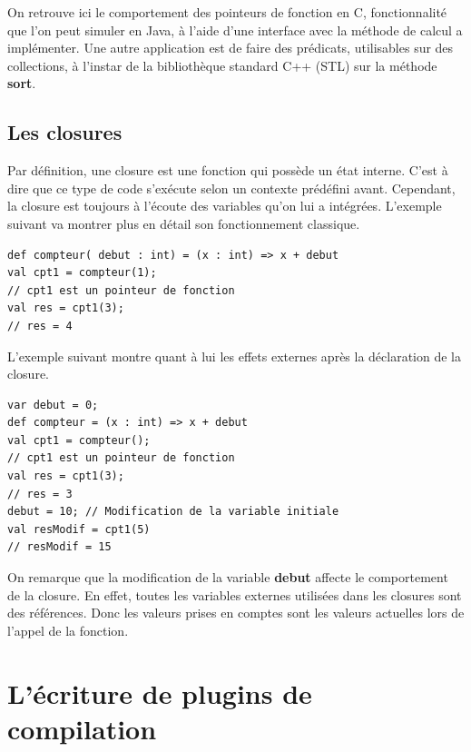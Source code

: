 \documentclass[a4paper,11pt]{report}
\begin{document}
{{{	On retrouve ici le comportement des pointeurs de fonction en C, fonctionnalité que l'on peut simuler en Java, à l'aide d'une interface avec la méthode de calcul a implémenter. Une autre application est de faire des prédicats, utilisables sur des collections, à l'instar de la bibliothèque standard C++ (STL) sur la méthode {\bf sort}.\\
} 

\subsection{Les closures}
\vspace{6mm}
\normalsize{
Par définition, une closure est une fonction qui possède un état interne. C'est à dire que ce type de code s'exécute selon un contexte prédéfini avant. Cependant, la closure est toujours à l'écoute des variables qu'on lui a intégrées. L'exemple suivant va montrer plus en détail son fonctionnement classique.\\
}

 \begin{lstlisting}
def compteur( debut : int) = (x : int) => x + debut
val cpt1 = compteur(1);
// cpt1 est un pointeur de fonction
val res = cpt1(3);
// res = 4
\end{lstlisting}
\vspace{6mm}

\normalsize{
\noindent
L'exemple suivant montre quant à lui les effets externes après la déclaration de la closure.\\
}

 \begin{lstlisting}
var debut = 0;
def compteur = (x : int) => x + debut
val cpt1 = compteur();
// cpt1 est un pointeur de fonction
val res = cpt1(3);
// res = 3
debut = 10; // Modification de la variable initiale
val resModif = cpt1(5)
// resModif = 15
\end{lstlisting}

\normalsize{
On remarque que la modification de la variable {\bf debut} affecte le comportement de la closure. En effet, toutes les variables externes utilisées dans les closures sont des références. Donc  les valeurs prises en comptes sont les valeurs actuelles lors de l'appel de la fonction. 
}

\section{L'écriture de plugins de compilation}

}}
\end{document}
